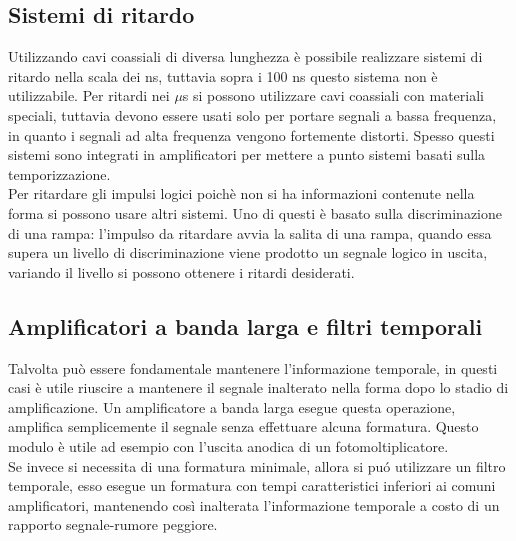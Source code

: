 \subsection{Sistemi di ritardo}
Utilizzando cavi coassiali di diversa lunghezza \`e possibile realizzare sistemi di ritardo nella scala dei ns, tuttavia sopra i 100 ns questo sistema non \`e utilizzabile.
Per ritardi nei $\mu$s si possono utilizzare cavi coassiali con materiali speciali, tuttavia devono essere usati solo per portare segnali a bassa frequenza,
in quanto i segnali ad alta frequenza vengono fortemente distorti.
Spesso questi sistemi sono integrati in amplificatori per mettere a punto sistemi basati sulla temporizzazione.\\
Per ritardare gli impulsi logici poich\`e non si ha informazioni contenute nella forma si possono usare altri sistemi.
Uno di questi \`e basato sulla discriminazione di una rampa: l'impulso da ritardare avvia la salita di una rampa, quando essa supera un livello di discriminazione
viene prodotto un segnale logico in uscita, variando il livello si possono ottenere i ritardi desiderati.
\subsection{Amplificatori a banda larga e filtri temporali}
Talvolta pu\`o essere fondamentale mantenere l'informazione temporale, in questi casi \`e utile riuscire a mantenere il segnale inalterato nella forma
dopo lo stadio di amplificazione.
Un amplificatore a banda larga esegue questa operazione, amplifica semplicemente il segnale senza effettuare alcuna formatura.
Questo modulo \`e utile ad esempio con l'uscita anodica di un fotomoltiplicatore.\\
Se invece si necessita di una formatura minimale, allora si pu\'o utilizzare un filtro temporale, esso esegue un formatura con tempi
caratteristici inferiori ai comuni amplificatori, mantenendo cos\`i inalterata l'informazione temporale a costo di un rapporto segnale-rumore peggiore.
